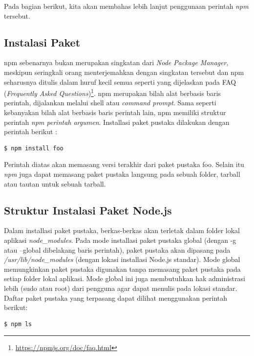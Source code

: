 Pada bagian berikut, kita akan membahas lebih lanjut penggunaan perintah \textit{npm} tersebut.

\subsection{Instalasi Paket}

npm sebenarnya bukan merupakan singkatan dari \textit{Node Package Manager}, meskipun seringkali orang menterjemahkan dengan singkatan tersebut dan npm seharusnya ditulis dalam huruf kecil semua seperti yang dijelaskan pada FAQ (\textit{Frequently Asked Questions})\footnote{\url{https://npmjs.org/doc/faq.html}}. npm merupakan bilah alat berbasis baris perintah, dijalankan melalui shell atau \textit{command prompt}. Sama seperti kebanyakan bilah alat berbasis baris perintah lain, npm memiliki struktur perintah \textit{npm perintah argumen}. Installasi paket pustaka dilakukan dengan perintah berikut :

\lstset{language=bash,caption=Cara install paket menggunakan npm}
\begin{lstlisting}
$ npm install foo
\end{lstlisting}

Perintah diatas akan memasang versi terakhir dari paket pustaka foo. Selain itu \textit{npm} juga dapat memasang paket pustaka langsung pada sebuah folder, tarball atau tautan untuk sebuah tarball.

\subsection{Struktur Instalasi Paket Node.js}

Dalam installasi paket pustaka, berkas-berkas akan terletak dalam folder lokal aplikasi \textit{node\_modules}. Pada mode installasi paket pustaka global (dengan -g atau --global dibelakang baris perintah), paket pustaka akan dipasang pada \textit{/usr/lib/node\_modules} (dengan lokasi installasi Node.js standar). Mode global memungkinkan paket pustaka digunakan tanpa memasang paket pustaka pada setiap folder lokal aplikasi. Mode global ini juga membutuhkan hak administrasi lebih (sudo atau root) dari pengguna agar dapat menulis pada lokasi standar. Daftar paket pustaka yang terpasang dapat dilihat menggunakan perintah berikut:

\lstset{language=bash,caption=Argumen npm untuk melihat daftar paket terpasang}
\begin{lstlisting}
$ npm ls
\end{lstlisting}

